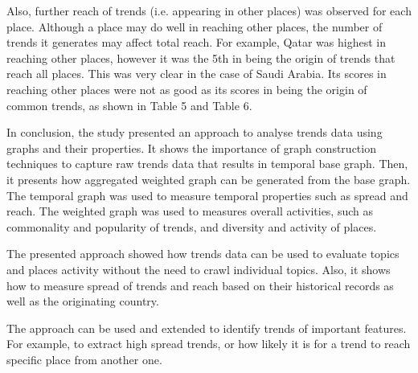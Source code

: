\documentclass{llncs}
\begin{document}
Also, further reach of trends (i.e. appearing in other places) was
observed for each place. Although a place may do well in reaching
other places, the number of trends it generates may affect total
reach. For example, Qatar was highest in reaching other places,
however it was the 5th in being the origin of trends that reach all
places. This was very clear in the case of Saudi Arabia. Its scores in
reaching other places were not as good as its scores in being the
origin of common trends, as shown in Table 5 and Table 6.

In conclusion, the study presented an approach to analyse trends data
using graphs and their properties. It shows the importance of graph
construction techniques to capture raw trends data that results in
temporal base graph. Then, it presents how aggregated weighted graph
can be generated from the base graph. The temporal graph was used to
measure temporal properties such as spread and reach. The weighted
graph was used to measures overall activities, such as commonality and
popularity of trends, and diversity and activity of places.

The presented approach showed how trends data can be used to evaluate
topics and places activity without the need to crawl individual
topics. Also, it shows how to measure spread of trends and reach based
on their historical records as well as the originating country.
 
The approach can be used and extended to identify trends of important
features. For example, to extract high spread trends, or how likely it
is for a trend to reach specific place from another one. 






\end{document}

